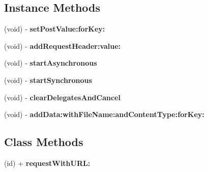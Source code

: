 \subsection*{Instance Methods}
\begin{DoxyCompactItemize}
\item 
\mbox{\label{protocol_t_b_s_d_k_connection_protocol_01-p_a3905ed169341862e043b66ef855f7451}} 
(void) -\/ {\bfseries set\+Post\+Value\+:for\+Key\+:}
\item 
\mbox{\label{protocol_t_b_s_d_k_connection_protocol_01-p_a164846cc82c4b93e3e3fc8f6f7395926}} 
(void) -\/ {\bfseries add\+Request\+Header\+:value\+:}
\item 
\mbox{\label{protocol_t_b_s_d_k_connection_protocol_01-p_afbe0445fae60ab0a27400294525d3f03}} 
(void) -\/ {\bfseries start\+Asynchronous}
\item 
\mbox{\label{protocol_t_b_s_d_k_connection_protocol_01-p_aad935838a1906fe0a5c4731a37129c4d}} 
(void) -\/ {\bfseries start\+Synchronous}
\item 
\mbox{\label{protocol_t_b_s_d_k_connection_protocol_01-p_aa756fb66c966770a70efdd737c613dc8}} 
(void) -\/ {\bfseries clear\+Delegates\+And\+Cancel}
\item 
\mbox{\label{protocol_t_b_s_d_k_connection_protocol_01-p_a4082122a4d1dd33b1d1429e84e524dad}} 
(void) -\/ {\bfseries add\+Data\+:with\+File\+Name\+:and\+Content\+Type\+:for\+Key\+:}
\end{DoxyCompactItemize}
\subsection*{Class Methods}
\begin{DoxyCompactItemize}
\item 
\mbox{\label{protocol_t_b_s_d_k_connection_protocol_01-p_a2a1a64777a787ab146a298db575135b1}} 
(id) + {\bfseries request\+With\+U\+R\+L\+:}
\end{DoxyCompactItemize}
